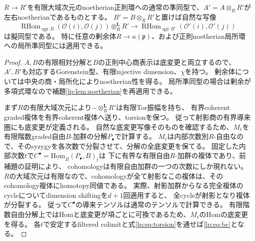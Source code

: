 \begin{proposition}[線束Homの底変更]\label{lp:prop:basechange}
$R\to R'$を有限大域次元のnoetherian正則環への通常の準同型で、$A'=A\otimes_RR'$が左右noetherianであるものとする。
$B'=B\otimes_RR'$と置けば自然な写像
\[
 \operatorname{RHom}_{\operatorname{qgr}B}(\mathcal O(i),\mathcal O(j))
 \otimes_R^{\mathbf L}R'
 \longrightarrow
 \operatorname{RHom}_{\operatorname{qgr}B'}(\mathcal O'(i),\mathcal O'(j))
 \tag{BC}\label{lp:eq:bc}
\]
は擬同型である。
特に任意の剰余体$R\to\kappa(\mathfrak p)$、および正則noetherian局所環への局所準同型には適用できる。
\end{proposition}
\begin{proof}
$A,B$の有限相対分解と$B$の正則中心商表示は底変更と両立するので、
$A',B'$も対応するGorenstein型、有限injective dimension、$\chi$を持つ。
剰余体については中央の商・局所化によりnoetherian性を得る。
局所準同型の場合は剰余が多項式環なので補題\ref{lp:lem:noetherian}を再適用できる。

まず$R$の有限大域次元により$-\otimes_R^{\mathbf L}R'$は有限Tor振幅を持ち、
有界coherent graded複体を有界coherent複体へ送り、torsionを保つ。
従って射影商の有界導来圏にも底変更が定義される。
自然な底変更写像そのものを確認するため、$M_\ell$を有限階数graded自由$B$-加群の分解$P_\bullet$で計算する。
$M_\ell$は内部次数別$R$-自由なので、そのsyzygyを各次数で分裂させて、分解の全底変更を保てる。
固定した内部次数$t$で$C^\bullet=\operatorname{\underline{Hom}}_B(P_\bullet,B)_t$は
下に有界な有限自由$R$-加群の複体であり、前補題の証明により、
cohomologyは有限自由加群の一つの次数にしか現れない。
$R$の大域次元は有限なので、cohomologyが全て射影なこの複体は、そのcohomology複体にhomotopy同値である。
実際、射影加群からなる完全複体のcycleについてdimension shiftingを$d+1$回適用すると、
全cycleが射影となり複体が分裂する。
従って$C^\bullet$の導来テンソルは通常のテンソルで計算できる。
有限階数自由分解上ではHomと底変更が項ごとに可換であるため、$M_\ell$のHomの底変更を得る。
各$t$で安定するfiltered colimitと式\eqref{lp:eq:torsion}を通せば\eqref{lp:eq:bc}となる。
\end{proof}

